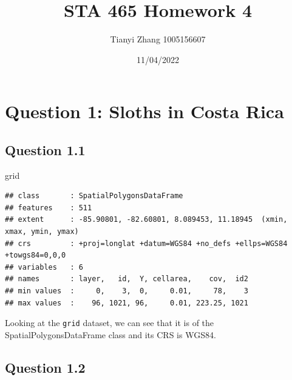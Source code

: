 \documentclass[
]{article}
\title{STA 465 Homework 4}
\author{Tianyi Zhang 1005156607}
\date{11/04/2022}
\newenvironment{Shaded}{\begin{snugshade}}{\end{snugshade}}
\newcommand{\NormalTok}[1]{#1}
\begin{document}
\maketitle

\hypertarget{question-1-sloths-in-costa-rica}{%
\section{Question 1: Sloths in Costa
Rica}\label{question-1-sloths-in-costa-rica}}

\hypertarget{question-1.1}{%
\subsection{Question 1.1}\label{question-1.1}}

\begin{Shaded}
\begin{Highlighting}[]
\NormalTok{grid}
\end{Highlighting}
\end{Shaded}

\begin{verbatim}
## class       : SpatialPolygonsDataFrame 
## features    : 511 
## extent      : -85.90801, -82.60801, 8.089453, 11.18945  (xmin, xmax, ymin, ymax)
## crs         : +proj=longlat +datum=WGS84 +no_defs +ellps=WGS84 +towgs84=0,0,0 
## variables   : 6
## names       : layer,   id,  Y, cellarea,    cov,  id2 
## min values  :     0,    3,  0,     0.01,     78,    3 
## max values  :    96, 1021, 96,     0.01, 223.25, 1021
\end{verbatim}

Looking at the \texttt{grid} dataset, we can see that it is of the
SpatialPolygonsDataFrame class and its CRS is WGS84.

\hypertarget{question-1.2}{%
\subsection{Question 1.2}\label{question-1.2}}
\end{document}
